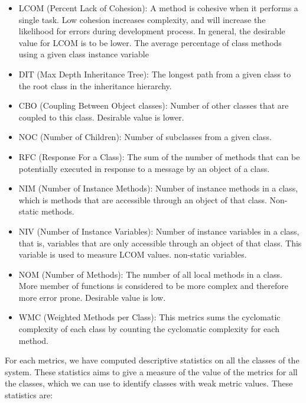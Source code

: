 \begin{itemize}
	\item LCOM (Percent Lack of Cohesion): A method is cohesive when it performs a single task. Low cohesion increases complexity, and will increase the likelihood for errors during development process. In general, the desirable value for LCOM is to be lower. The average percentage of class methods using a given class instance variable

	\item DIT (Max Depth Inheritance Tree): The longest path from a given class to the root class in the inheritance hierarchy.

\item CBO (Coupling Between Object classes): Number of other classes that are coupled to this class. Desirable value is lower. 

\item NOC (Number of Children): Number of subclasses from a given class.

\item RFC (Response For a Class): The sum of the number of methods that can be potentially executed in response to a message by an object of a class.

\item NIM (Number of Instance Methods): Number of instance methods in a class, which is methods that are accessible through an object of that class. Non-static methods.

\item NIV (Number of Instance Variables): Number of instance variables in a class, that is, variables that are only accessible through an object of that class. This variable is used to measure LCOM values. non-static variables.

\item NOM (Number of Methods): The number of all local methods in a class. More member of functions is considered to be more complex and therefore more error prone. Desirable value is low.

\item WMC (Weighted Methods per Class): This metrics sums the cyclomatic complexity of each class by counting the cyclomatic complexity for each method.
\end{itemize}


For each metrics, we have computed descriptive statistics on all the classes of the system. These statistics aims to give a measure of the value of the metrics for all the classes, which we can use to identify classes with weak metric values. These statistics are:

